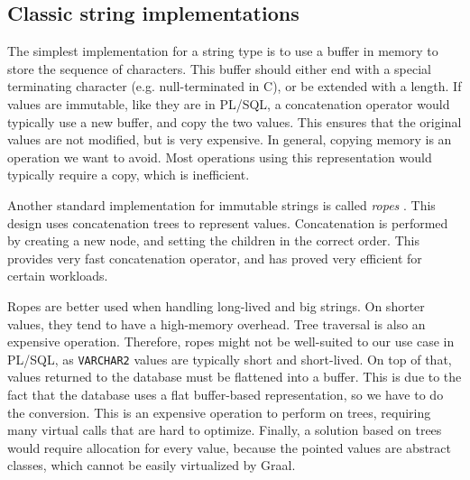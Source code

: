 \documentclass[twoside,11pt,a4paper]{article}
\newcommand{\pls}[1]{\texttt{#1}}
\newcommand{\plstype}[1]{\pls{#1}}
\newcommand{\varchar}{\plstype{VARCHAR2}}
\begin{document}
\subsection{Classic string implementations}


The simplest implementation for a string type is to use a buffer in memory to store the sequence of characters. This buffer should either end with a special terminating character (e.g. null-terminated in C), or be extended with a length. If values are immutable, like they are in PL/SQL, a concatenation operator would typically use a new buffer, and copy the two values. This ensures that the original values are not modified, but is very expensive. In general, copying memory is an operation we want to avoid. Most operations using this representation would typically require a copy, which is inefficient.

Another standard implementation for immutable strings is called \textit{ropes} \cite{ropepaper}. This design uses concatenation trees to represent values. Concatenation is performed by creating a new node, and setting the children in the correct order. This provides very fast concatenation operator, and has proved very efficient for certain workloads.

Ropes are better used when handling long-lived and big strings. On shorter values, they tend to have a high-memory overhead. Tree traversal is also an expensive operation. Therefore, ropes might not be well-suited to our use case in PL/SQL, as \varchar{} values are typically short and short-lived. On top of that, values returned to the database must be flattened into a buffer. This is due to the fact that the database uses a flat buffer-based representation, so we have to do the conversion. This is an expensive operation to perform on trees, requiring many virtual calls that are hard to optimize. Finally, a solution based on trees would require allocation for every value, because the pointed values are abstract classes, which cannot be easily virtualized by Graal.
\end{document}
